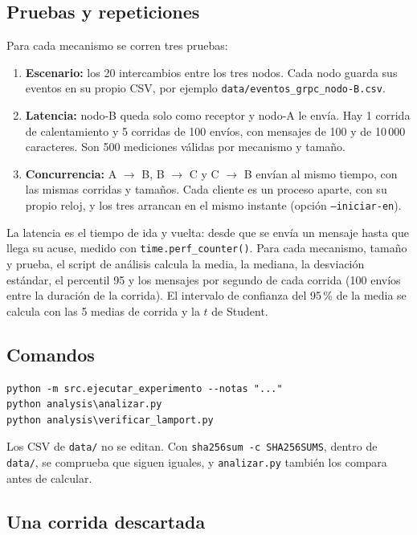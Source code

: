 \documentclass[11pt,a4paper]{article}
\begin{document}
\subsection{Pruebas y repeticiones}

Para cada mecanismo se corren tres pruebas:

\begin{enumerate}[leftmargin=*]
  \item \textbf{Escenario:} los 20 intercambios entre los tres nodos. Cada nodo guarda sus eventos en su propio CSV, por ejemplo \texttt{data/eventos\_grpc\_nodo-B.csv}.
  \item \textbf{Latencia:} nodo-B queda solo como receptor y nodo-A le envía. Hay 1 corrida de calentamiento y 5 corridas de 100 envíos, con mensajes de 100 y de 10\,000 caracteres. Son 500 mediciones válidas por mecanismo y tamaño.
  \item \textbf{Concurrencia:} A $\rightarrow$ B, B $\rightarrow$ C y C $\rightarrow$ B envían al mismo tiempo, con las mismas corridas y tamaños. Cada cliente es un proceso aparte, con su propio reloj, y los tres arrancan en el mismo instante (opción \texttt{--iniciar-en}).
\end{enumerate}

La latencia es el tiempo de ida y vuelta: desde que se envía un mensaje hasta que llega su acuse, medido con \texttt{time.perf\_counter()}. Para cada mecanismo, tamaño y prueba, el script de análisis calcula la media, la mediana, la desviación estándar, el percentil 95 y los mensajes por segundo de cada corrida (100 envíos entre la duración de la corrida). El intervalo de confianza del 95\,\% de la media se calcula con las 5 medias de corrida y la $t$ de Student.

\subsection{Comandos}

\begin{lstlisting}
python -m src.ejecutar_experimento --notas "..."
python analysis\analizar.py
python analysis\verificar_lamport.py
\end{lstlisting}

Los CSV de \texttt{data/} no se editan. Con \texttt{sha256sum -c SHA256SUMS}, dentro de \texttt{data/}, se comprueba que siguen iguales, y \texttt{analizar.py} también los compara antes de calcular.

\subsection{Una corrida descartada}
\end{document}
